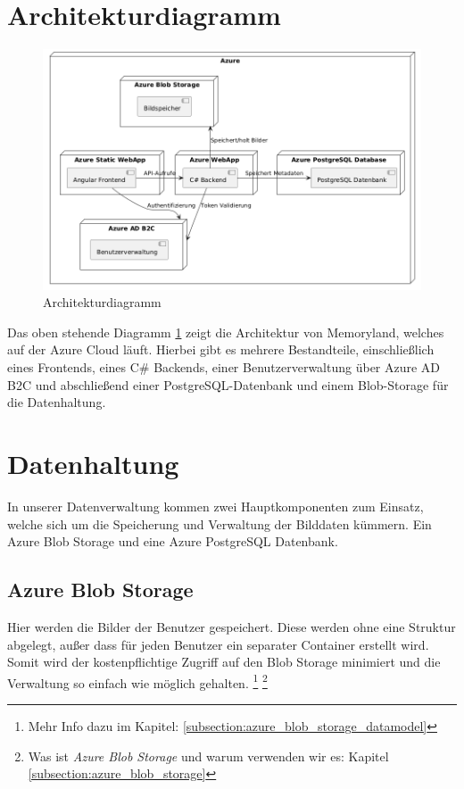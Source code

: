 
\section{Architekturdiagramm}

\begin{figure} [h t]
    \centering
    \includegraphics[scale=0.4]{puml/architecture-diagram.png}
    \caption{Architekturdiagramm}
    \label{fig:architectur-diagram}
\end{figure}

Das oben stehende Diagramm \ref{fig:architectur-diagram} zeigt die Architektur von Memoryland,
welches auf der Azure Cloud läuft. Hierbei gibt es mehrere Bestandteile, 
einschlie\ss{}lich eines Frontends, eines C\# Backends, einer Benutzerverwaltung 
über Azure AD B2C und abschlie\ss{}end einer PostgreSQL-Datenbank und einem 
Blob-Storage für die Datenhaltung.

\section{Datenhaltung}

In unserer Datenverwaltung kommen zwei Hauptkomponenten zum Einsatz, welche sich um die 
Speicherung und Verwaltung der Bilddaten kümmern. Ein Azure Blob Storage und eine Azure 
PostgreSQL Datenbank.

\subsection{Azure Blob Storage}

Hier werden die Bilder der Benutzer gespeichert. Diese werden 
ohne eine Struktur abgelegt, au\ss{}er dass für jeden Benutzer ein separater Container erstellt 
wird. Somit wird der kostenpflichtige Zugriff auf den Blob Storage minimiert und die Verwaltung
so einfach wie möglich gehalten.
\footnote{Mehr Info dazu im Kapitel: \ref{subsection:azure_blob_storage_datamodel}}
\footnote{Was ist \emph{Azure Blob Storage} und warum verwenden wir es: Kapitel \ref{subsection:azure_blob_storage}}

